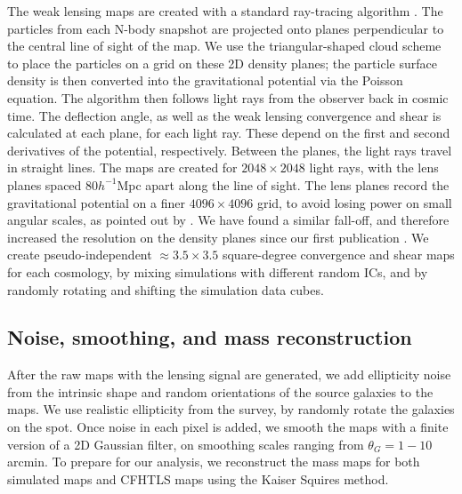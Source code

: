 \documentclass[10pt, preprint]{aastex}
\begin{document}
The weak lensing maps are created with a standard ray-tracing
algorithm \citep{H&M01}. The particles from each N-body snapshot are
projected onto planes perpendicular to the central line of sight of
the map.  We use the triangular-shaped cloud scheme
\citep{Hockney-Eastwood} to place the particles on a grid on these 2D
density planes; the particle surface density is then converted into
the gravitational potential via the Poisson equation. The algorithm
then follows light rays from the observer back in cosmic time. The
deflection angle, as well as the weak lensing convergence and shear is
calculated at each plane, for each light ray. These depend on the
first and second derivatives of the potential, respectively. Between
the planes, the light rays travel in straight lines.  The maps are
created for $2048\times2048$ light rays, with the lens planes spaced
$80h^{-1}$Mpc apart along the line of sight. The lens planes record
the gravitational potential on a finer $4096\times4096$ grid, to avoid
losing power on small angular scales, as pointed out by
\citet{Sato09}. We have found a similar fall-off, and therefore
increased the resolution on the density planes since our first
publication \citep{KHM09}.  We create pseudo-independent $\approx
3.5\times3.5$ square-degree convergence and shear maps for each
cosmology, by mixing simulations with different random ICs, and by
randomly rotating and shifting the simulation data cubes.

\subsection{Noise, smoothing, and mass reconstruction}

After the raw maps with the lensing signal are generated, we add
ellipticity noise from the intrinsic shape and random orientations of 
the source galaxies to the maps. We use realistic ellipticity from the 
survey, by randomly rotate the galaxies on the spot.
Once noise in each pixel is added, we smooth the maps
with a finite version of a 2D Gaussian filter, on smoothing scales
ranging from $\theta_G = 1-10$ arcmin.
To prepare for our analysis, we reconstruct the mass maps for 
both simulated maps and CFHTLS maps using the Kaiser Squires 
method\cite{Kaiser1993}.
\end{document}
